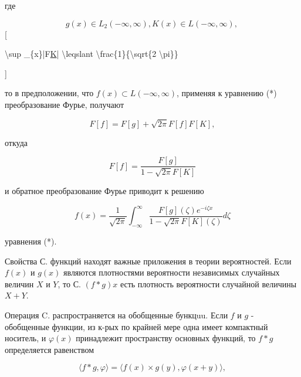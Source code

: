 \documentclass[10pt]{article}
\begin{document}
где



\[

g(x) \in L_{2}(-\infty, \infty), K(x) \in L(-\infty, \infty) \text {, }

\][



\textbackslash sup \_\{x\}|F\href{x}{K}| \textbackslash leqslant \textbackslash frac\{1\}\{\textbackslash sqrt\{2 \textbackslash pi\}\}

]



то в предположении, что $f(x) \subset L(-\infty, \infty)$, применяя к уравнению (*) преобразование Фурье, получают



\[

F[f]=F[g]+\sqrt{2 \pi} F[f] F[K],

\]



откуда



\[

F[f]=\frac{F[g]}{1-\sqrt{2 \pi} F[K]}

\]



и обратное преобразование Фурье приводит к решению



\[

f(x)=\frac{1}{\sqrt{2 \pi}} \int_{-\infty}^{\infty} \frac{F[g](\zeta) e^{-i \zeta x}}{1-\sqrt{2 \pi} F[K](\zeta)} d \zeta

\]



уравнения (*).



Свойства С. функций находят важные приложения в теории вероятностей. Если $f(x)$ и $g(x)$ являются плотностями вероятности независимых случайных величин $X$ и $Y$, то С. $(f * g) x$ есть плотность вероятности случайной величины $X+Y$.



Операция C. распространяется на обобщенные бункцuu. Если $f$ и $g$ - обобщенные функции, из к-рых по крайней мере одна имеет компактный носитель, и $\varphi(x)$ принадлежит пространству основных функций, то $f * g$ определяется равенством



\[

\langle f * g, \varphi\rangle=\langle f(x) \times g(y), \varphi(x+y)\rangle,

\]
\end{document}
